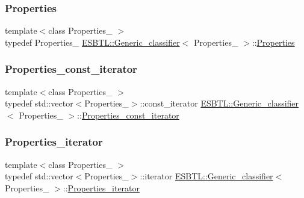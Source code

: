 \subsubsection{\texorpdfstring{Properties}{Properties}}
{\footnotesize\ttfamily template$<$class Properties\+\_\+ $>$ \\
typedef Properties\+\_\+ \hyperlink{structESBTL_1_1Generic__classifier}{E\+S\+B\+T\+L\+::\+Generic\+\_\+classifier}$<$ Properties\+\_\+ $>$\+::\hyperlink{structESBTL_1_1Generic__classifier_aef70ade88efad6f1819bfd389b925ac9}{Properties}}

\mbox{\label{structESBTL_1_1Generic__classifier_aa2bfed4b529df9cbc252bacf20a15174}} 
\subsubsection{\texorpdfstring{Properties\+\_\+const\+\_\+iterator}{Properties\_const\_iterator}}
{\footnotesize\ttfamily template$<$class Properties\+\_\+ $>$ \\
typedef std\+::vector$<$Properties\+\_\+$>$\+::const\+\_\+iterator \hyperlink{structESBTL_1_1Generic__classifier}{E\+S\+B\+T\+L\+::\+Generic\+\_\+classifier}$<$ Properties\+\_\+ $>$\+::\hyperlink{structESBTL_1_1Generic__classifier_aa2bfed4b529df9cbc252bacf20a15174}{Properties\+\_\+const\+\_\+iterator}}

\mbox{\label{structESBTL_1_1Generic__classifier_a5f82ff1a1ee75714d393ded0c3824fe6}} 
\subsubsection{\texorpdfstring{Properties\+\_\+iterator}{Properties\_iterator}}
{\footnotesize\ttfamily template$<$class Properties\+\_\+ $>$ \\
typedef std\+::vector$<$Properties\+\_\+$>$\+::iterator \hyperlink{structESBTL_1_1Generic__classifier}{E\+S\+B\+T\+L\+::\+Generic\+\_\+classifier}$<$ Properties\+\_\+ $>$\+::\hyperlink{structESBTL_1_1Generic__classifier_a5f82ff1a1ee75714d393ded0c3824fe6}{Properties\+\_\+iterator}}

